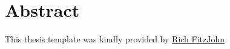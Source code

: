\chapter*{Abstract}

This thesis template was kindly provided by \href{http://richfitz.github.io/}{Rich FitzJohn}
%

